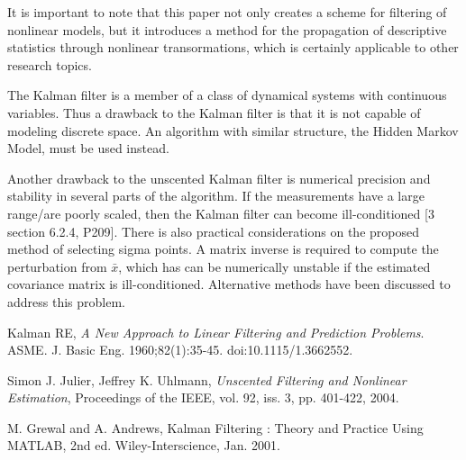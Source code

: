 \documentclass{article}
\begin{document}
It is important to note that this paper not only creates a scheme for filtering of nonlinear models, but it introduces a method for the propagation of descriptive statistics through nonlinear transormations, which is certainly applicable to other research topics.

The Kalman filter is a member of a class of dynamical systems with continuous variables. Thus a drawback to the Kalman filter is that it is not capable of modeling discrete space. An algorithm with similar structure, the Hidden Markov Model, must be used instead.

Another drawback to the unscented Kalman filter is numerical precision and stability in several parts of the algorithm. If the measurements have a large range/are poorly scaled, then the Kalman filter can become ill-conditioned [3 section 6.2.4, P209]. There is also practical considerations on the proposed method of selecting sigma points. A matrix inverse is required to compute the perturbation from $\bar x$, which has can be numerically unstable if the estimated covariance matrix is ill-conditioned. Alternative methods have been discussed to address this problem.

\begin{thebibliography}{999}

  Kalman RE,
  \emph{A New Approach to Linear Filtering and Prediction Problems}. ASME. J. Basic Eng. 1960;82(1):35-45. doi:10.1115/1.3662552.

  Simon J. Julier, Jeffrey K. Uhlmann, \emph{Unscented Filtering and Nonlinear Estimation}, Proceedings of the IEEE, vol. 92, iss. 3, pp. 401-422, 2004.

M. Grewal and A. Andrews, Kalman Filtering : Theory and Practice Using MATLAB, 2nd ed. Wiley-Interscience, Jan. 2001.

\end{thebibliography}
\end{document}

